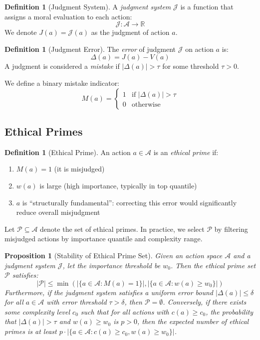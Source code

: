 \documentclass[12pt,a4paper]{article}
\newtheorem{proposition}[theorem]{Proposition}
\theoremstyle{definition}
\newtheorem{definition}[theorem]{Definition}
\theoremstyle{remark}
\begin{document}
\begin{definition}[Judgment System]
A \emph{judgment system} $\mathcal{J}$ is a function that assigns a moral evaluation to each action:
\[
\mathcal{J}: \mathcal{A} \to \mathbb{R}
\]
We denote $J(a) = \mathcal{J}(a)$ as the judgment of action $a$.
\end{definition}

\begin{definition}[Judgment Error]
The \emph{error} of judgment $\mathcal{J}$ on action $a$ is:
\[
\Delta(a) = J(a) - V(a)
\]
A judgment is considered a \emph{mistake} if $|\Delta(a)| > \tau$ for some threshold $\tau > 0$.
\end{definition}

We define a binary mistake indicator:
\[
M(a) = \begin{cases}
1 & \text{if } |\Delta(a)| > \tau \\
0 & \text{otherwise}
\end{cases}
\]

\subsection{Ethical Primes}

\begin{definition}[Ethical Prime]
An action $a \in \mathcal{A}$ is an \emph{ethical prime} if:
\begin{enumerate}
    \item $M(a) = 1$ (it is misjudged)
    \item $w(a)$ is large (high importance, typically in top quantile)
    \item $a$ is ``structurally fundamental'': correcting this error would significantly reduce overall misjudgment
\end{enumerate}
\end{definition}

Let $\mathcal{P} \subseteq \mathcal{A}$ denote the set of ethical primes. In practice, we select $\mathcal{P}$ by filtering misjudged actions by importance quantile and complexity range.

\begin{proposition}[Stability of Ethical Prime Set]
\label{prop:prime_stability}
Given an action space $\mathcal{A}$ and a judgment system $\mathcal{J}$, let the importance threshold be $w_0$. Then the ethical prime set $\mathcal{P}$ satisfies:
\[
|\mathcal{P}| \leq \min\left(|\{a \in \mathcal{A} : M(a) = 1\}|, |\{a \in \mathcal{A} : w(a) \geq w_0\}|\right)
\]
Furthermore, if the judgment system satisfies a uniform error bound $|\Delta(a)| \leq \delta$ for all $a \in \mathcal{A}$ with error threshold $\tau > \delta$, then $\mathcal{P} = \emptyset$. Conversely, if there exists some complexity level $c_0$ such that for all actions with $c(a) \geq c_0$, the probability that $|\Delta(a)| > \tau$ and $w(a) \geq w_0$ is $p > 0$, then the expected number of ethical primes is at least $p \cdot |\{a \in \mathcal{A} : c(a) \geq c_0, w(a) \geq w_0\}|$.
\end{proposition}
\end{document}
